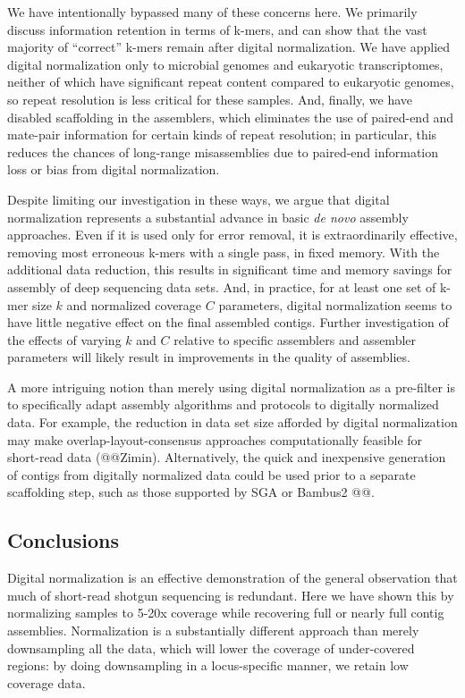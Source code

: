 \documentclass[10pt]{article}
\begin{document}
We have intentionally bypassed many of these concerns here. We
primarily discuss information retention in terms of k-mers, and can
show that the vast majority of ``correct'' k-mers remain after digital
normalization.  We have applied digital normalization only to
microbial genomes and eukaryotic transcriptomes, neither of which have
significant repeat content compared to eukaryotic genomes, so repeat
resolution is less critical for these samples.  And, finally, we have
disabled scaffolding in the assemblers, which eliminates the use of
paired-end and mate-pair information for certain kinds of repeat
resolution; in particular, this reduces the chances of long-range
misassemblies due to paired-end information loss or bias from digital
normalization.

Despite limiting our investigation in these ways, we argue that
digital normalization represents a substantial advance in basic {\em
  de novo} assembly approaches.  Even if it is used only for error
removal, it is extraordinarily effective, removing most erroneous
k-mers with a single pass, in fixed memory.  With the additional data
reduction, this results in significant time and memory savings for
assembly of deep sequencing data sets.  And, in practice, for at least
one set of k-mer size $k$ and normalized coverage $C$ parameters, digital
normalization seems to have little negative effect on the final
assembled contigs.  Further investigation of the effects of varying
$k$ and $C$ relative to specific assemblers and assembler parameters
will likely result in improvements in the quality of assemblies.

A more intriguing notion than merely using digital normalization as a
pre-filter is to specifically adapt assembly algorithms and protocols
to digitally normalized data.  For example, the reduction in data set
size afforded by digital normalization may make
overlap-layout-consensus approaches computationally feasible for
short-read data (@@Zimin).  Alternatively, the quick and inexpensive
generation of contigs from digitally normalized data could be used
prior to a separate scaffolding step, such as those supported by
SGA or Bambus2 @@.

\subsection*{Conclusions}

Digital normalization is an effective demonstration of the general
observation that much of short-read shotgun sequencing is redundant.
Here we have shown this by normalizing samples to 5-20x coverage while
recovering full or nearly full contig assemblies.
Normalization is a substantially different approach than merely
downsampling all the data, which will lower the coverage of
under-covered regions: by doing downsampling in a locus-specific
manner, we retain low coverage data.
\end{document}
